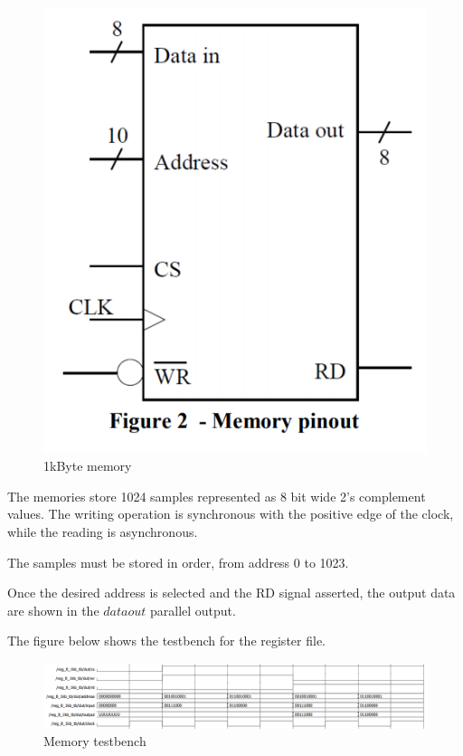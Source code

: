 \documentclass[12pt]{article}
\begin{document}
\begin{figure}[h]
	\centering
	\includegraphics[scale = 0.7]{immagini/memory.png}
	\caption{ 1kByte memory }
\end{figure}

The memories store 1024 samples represented as 8 bit wide 2's complement values.
The writing operation is synchronous with the positive edge of the clock, while the reading is asynchronous. 

The samples must be stored in order, from address 0 to 1023.

Once the desired address is selected and the RD signal asserted, the output data are shown in the $ data out $ parallel output.

The figure below shows the testbench for the register file.
\newline\newline\newline
\begin{figure}[h]
	\centering
	\includegraphics[scale = 0.55]{immagini/memory_tb.png}
	\caption{Memory testbench}
\end{figure}
\end{document}
